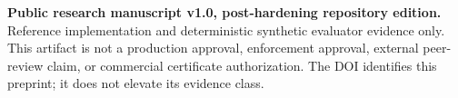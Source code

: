 \noindent
\colorbox{ArcanaPale}{%
  \parbox{\dimexpr\textwidth-2\fboxsep\relax}{%
    \small\sffamily
    \textbf{Public research manuscript v1.0, post-hardening repository edition.}
    Reference implementation and deterministic synthetic evaluator evidence
    only. This artifact is not a production approval, enforcement approval,
    external peer-review claim, or commercial certificate authorization. The
    DOI identifies this preprint; it does not elevate its evidence class.
  }%
}
\vspace{10pt}
